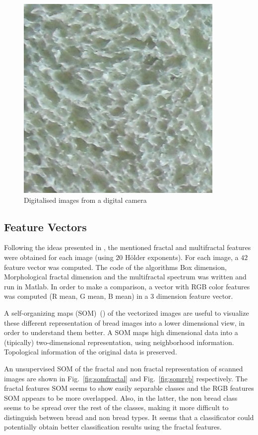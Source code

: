 \documentclass[oneside,a4paper,english,links]{amca}
\begin{document}
\begin{figure}[htb]
\includegraphics[scale=0.28]{imagenes/camera/Sa14}
\caption{Digitalised images from a digital camera}
\label{fig:camera}
\end{figure}

\subsection{Feature Vectors}


Following the ideas presented in \cite{Gonzales2008}, the mentioned fractal and multifractal features were obtained for each image (using $20$ H\"older exponents). For each image, a $42$ feature vector was computed. The code of the algorithms Box dimension, Morphological fractal dimension and the multifractal spectrum was written and run in Matlab. In order to make a comparison, a vector with RGB color features was computed (R mean, G mean, B mean) in a $3$ dimension feature vector.

A self-organizing maps (SOM)~(\cite{Kohonen2001}) of the vectorized images are useful to visualize these different representation of bread images into a lower dimensional view, in order to understand them better. A SOM maps high dimensional data into a (tipically) two-dimensional representation, using neighborhood information. Topological information of the original data is preserved.  

An unsupervised SOM of the fractal and non fractal representation of scanned images are shown in Fig.~\ref{fig:somfractal} and Fig.~\ref{fig:somrgb} respectively. The fractal features SOM seems to show easily separable classes and the RGB features SOM appears to be more overlapped. Also, in the latter, the non bread class seems to be spread over the rest of the classes, making it more difficult to distinguish between bread and non bread types. It seems that a classificator could potentially obtain better classification results using the fractal features. %
\end{document}
